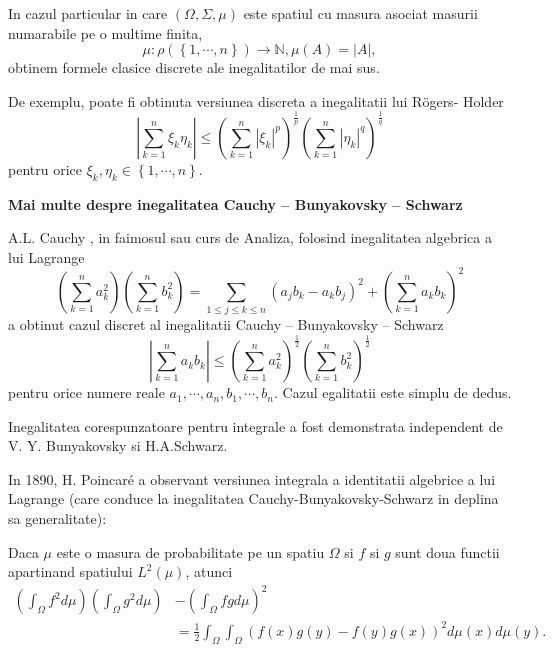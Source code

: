 \documentclass[a4paper,12pt,oneside]{report}
\begin{document}
	In  cazul particular in care \(\left ( \Omega , \Sigma, \mu \right )\) este spatiul cu masura asociat masurii numarabile pe o multime finita, \[\mu  : \rho \left ( \left \{ 1,\cdots, n \right \} \right )\rightarrow \mathbb{N}, \mu \left ( A \right ) = \left | A \right |,\]
obtinem formele clasice discrete ale inegalitatilor de mai sus.

De exemplu, poate fi obtinuta versiunea discreta a inegalitatii lui R\"{o}gers- Holder
\begin{displaymath}
  \left | \sum_{k=1}^{n} \xi _{k}\eta _{k}\right |\leq \left ( \sum_{k = 1}^{n}\left | \xi _{k}\right |^{p}  \right )^{\frac{1}{p}}\left ( \sum_{k = 1}^{n} \left | \eta _{k} \right |^{q}\right )^{\frac{1}{q}}
\end{displaymath}
pentru  orice \(\xi _{k}, \eta _{k} \in \left \{ 1,\cdots,n \right \}.\)




\textbf{Mai multe despre inegalitatea Cauchy – Bunyakovsky – Schwarz}

A.L. Cauchy , in faimosul sau curs de Analiza, folosind inegalitatea algebrica a  lui Lagrange
\begin{displaymath}
  \left ( \sum_{k = 1}^{n} a_{k}^{2}\right )\left ( \sum_{k = 1}^{n} b_{k}^{2}\right ) =  \sum_{1\leq j\leq k\leq n}\left ( a_{j}b_{k} - a_{k}b_{j} \right )^{2} + \left ( \sum_{k = 1}^{n} a_{k}b_{k}\right )^{2}
\end{displaymath}
a obtinut cazul discret al inegalitatii Cauchy – Bunyakovsky – Schwarz
\begin{displaymath}
  \left | \sum_{k = 1}^{n} a_{k}b_{k} \right |\leq \left ( \sum_{k = 1}^{n}a_{k}^{2} \right )^{\frac{1}{2}}\left ( \sum_{k = 1}^{n}b_{k}^{2} \right )^{\frac{1}{2}}
\end{displaymath}
pentru orice numere reale \(a_{1},\cdots,a_{n}, b_{1},\cdots, b_{n}\). Cazul egalitatii este simplu de dedus.

Inegalitatea corespunzatoare pentru integrale a fost demonstrata independent de V. Y. Bunyakovsky si H.A.Schwarz.

	In 1890, H. Poincar\'{e} a observant versiunea integrala a identitatii algebrice a lui Lagrange (care conduce la inegalitatea Cauchy-Bunyakovsky-Schwarz in deplina sa generalitate):

Daca \(\mu\) este o masura de probabilitate pe un spatiu \(\Omega\) si \(f\) si \(g\) sunt doua functii apartinand spatiului \(L^{2}\left ( \mu  \right )\), atunci
\begin{displaymath}
\begin{split}
  \left (\int_{\Omega}f^{2}d\mu \right )\left (\int_{\Omega}g^{2}d\mu \right ) &- \left (\int_{\Omega}fgd\mu \right )^{2}\\
   &= \frac{1}{2}\int_{\Omega}\int_{\Omega}\left ( f\left ( x \right )g\left ( y \right ) - f\left ( y \right )g\left ( x \right )\right )^{2}d\mu \left ( x \right )d\mu \left ( y \right ).
  \end{split}
\end{displaymath}
	
\end{document}
